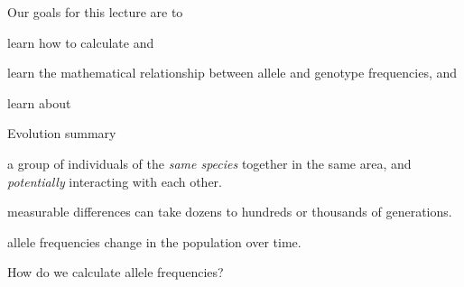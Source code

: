 \documentclass[t]{beamer}
\begin{document}
\begin{frame}
	
	
\end{frame}


\begin{frame}{Our goals for this lecture are to}
	
	\hangpara learn how to calculate  and 
	
	\hangpara learn the mathematical relationship between allele and genotype frequencies, and
	
	\hangpara learn about 
	
\end{frame}
%
\begin{frame}[t]{Evolution summary}

	\hangpara {} a group of individuals of the \emph{same species} together in the same area, and \emph{potentially} interacting with each other.
	
	\hangpara {} measurable differences can take dozens to hundreds or thousands of generations.
	
	\hangpara {} allele frequencies change in the population over time.
	
	\pause \hangpara How do we calculate allele frequencies?

\end{frame}
\end{document}
